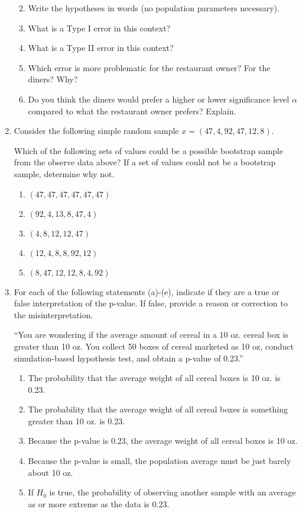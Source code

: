 \documentclass[
  letterpaper,
  DIV=11,
  numbers=noendperiod]{scrartcl}
\providecommand{\tightlist}{%
  \setlength{\itemsep}{0pt}\setlength{\parskip}{0pt}}\usepackage{longtable,booktabs,array}
\begin{document}
\begin{enumerate}
  \begin{enumerate}
  \def\labelenumii{\alph{enumii}.}
  \tightlist
  \item
    Write the hypotheses in words (no population parameters necessary).
  \item
    What is a Type I error in this context?
  \item
    What is a Type II error in this context?
  \item
    Which error is more problematic for the restaurant owner? For the
    diners? Why?
  \item
    Do you think the diners would prefer a higher or lower significance
    level \(\alpha\) compared to what the restaurant owner prefers?
    Explain.
  \end{enumerate}
\item
  Consider the following simple random sample
  \(x = (47, 4, 92, 47, 12, 8)\).

  Which of the following sets of values could be a possible bootstrap
  sample from the observe data above? If a set of values could not be a
  bootstrap sample, determine why not.

  \begin{enumerate}
  \def\labelenumii{\alph{enumii}.}
  \tightlist
  \item
    \((47, 47, 47, 47, 47, 47)\)
  \item
    \((92, 4, 13,8, 47, 4)\)
  \item
    \((4, 8, 12, 12, 47)\)
  \item
    \((12, 4, 8, 8, 92, 12)\)
  \item
    \((8, 47, 12, 12, 8, 4, 92)\)
  \end{enumerate}
\item
  For each of the following statements (a)-(e), indicate if they are a
  true or false interpretation of the p-value. If false, provide a
  reason or correction to the misinterpretation.

  ``You are wondering if the average amount of cereal in a 10 oz. cereal
  box is greater than 10 oz. You collect 50 boxes of cereal marketed as
  10 oz, conduct simulation-based hypothesis test, and obtain a p-value
  of 0.23.''

  \begin{enumerate}
  \def\labelenumii{\alph{enumii}.}
  \tightlist
  \item
    The probability that the average weight of all cereal boxes is 10
    oz. is 0.23.
  \item
    The probability that the average weight of all cereal boxes is
    something greater than 10 oz. is 0.23.
  \item
    Because the p-value is 0.23, the average weight of all cereal boxes
    is 10 oz.
  \item
    Because the p-value is small, the population average must be just
    barely about 10 oz.
  \item
    If \(H_{0}\) is true, the probability of observing another sample
    with an average as or more extreme as the data is 0.23.
  \end{enumerate}
\end{enumerate}
\end{document}

